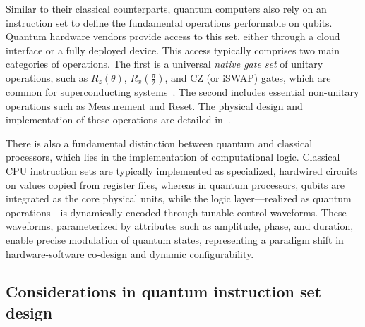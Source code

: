 \documentclass[a4paper,onecolumn,11pt,unpublished]{quantumarticle}
\begin{document}
Similar to their classical counterparts, quantum computers also rely on an instruction set to define the fundamental operations performable on qubits.
Quantum hardware vendors provide access to this set, either through a cloud interface or a fully deployed device. This access typically comprises two main categories of operations. The first is a universal \textit{native gate set} of unitary operations, such as $R_z(\theta)$, $R_x(\frac{\pi}{2})$, and CZ (or iSWAP) gates, which are common for superconducting systems~\cite{Krantz2019A}. 
The second includes essential non-unitary operations such as Measurement and Reset.
The physical design and implementation of these operations are detailed in~. 

There is also a fundamental distinction between quantum and classical processors, which lies in the implementation of computational logic.
Classical CPU instruction sets are typically implemented as specialized, hardwired circuits on values copied from register files, whereas in quantum processors, qubits are integrated as the core physical units, while the logic layer---realized as quantum operations---is dynamically encoded through tunable control waveforms. These waveforms, parameterized by attributes such as amplitude, phase, and duration, enable precise modulation of quantum states, representing a paradigm shift in hardware-software co-design and dynamic configurability.

\subsection{Considerations in quantum instruction set design}
\end{document}
